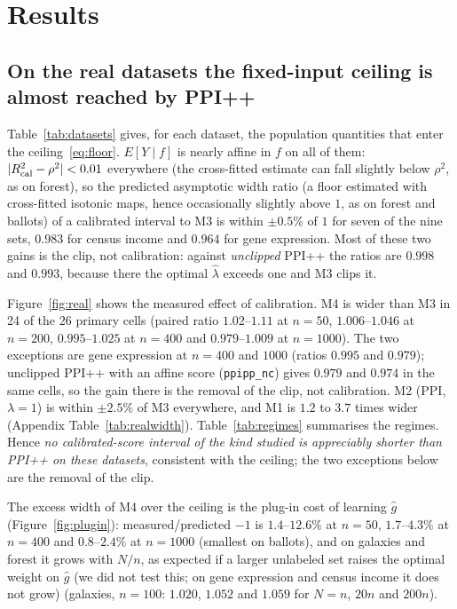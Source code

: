 \begin{table}[t]
\caption{Methods compared. All use only the labeled $(Y,f)$ and the unlabeled $f$.}
\label{tab:methods}
\centering\scriptsize
{}
\end{table}

\section{Results}
\label{sec:results}
\subsection{On the real datasets the fixed-input ceiling is almost reached by PPI++}
\label{sec:real}
Table~\ref{tab:datasets} gives, for each dataset, the population quantities that enter the ceiling~\eqref{eq:floor}. $E[Y\mid f]$ is nearly affine in $f$ on all of them: $|R^2_{\rm cal}-\rho^2|<0.01$ everywhere (the cross-fitted estimate can fall slightly below $\rho^2$, as on forest), so the predicted asymptotic width ratio (a floor estimated with cross-fitted isotonic maps, hence occasionally slightly above $1$, as on forest and ballots) of a calibrated interval to M3 is within $\pm0.5\%$ of $1$ for seven of the nine sets, $0.983$ for census income and $0.964$ for gene expression. Most of these two gains is the clip, not calibration: against \emph{unclipped} PPI++ the ratios are $0.998$ and $0.993$, because there the optimal $\hat\lambda$ exceeds one and M3 clips it.

Figure~\ref{fig:real} shows the measured effect of calibration. M4 is wider than M3 in 24 of the 26 primary cells (paired ratio $1.02$--$1.11$ at $n=50$, $1.006$--$1.046$ at $n=200$, $0.995$--$1.025$ at $n=400$ and $0.979$--$1.009$ at $n=1000$). The two exceptions are gene expression at $n=400$ and $1000$ (ratios $0.995$ and $0.979$); unclipped PPI++ with an affine score (\texttt{ppipp\_nc}) gives $0.979$ and $0.974$ in the same cells, so the gain there is the removal of the clip, not calibration. M2 (PPI, $\lambda=1$) is within $\pm2.5\%$ of M3 everywhere, and M1 is $1.2$ to $3.7$ times wider (Appendix Table~\ref{tab:realwidth}). Table~\ref{tab:regimes} summarises the regimes. Hence \emph{no calibrated-score interval of the kind studied is appreciably shorter than PPI++ on these datasets}, consistent with the ceiling; the two exceptions below are the removal of the clip.

The excess width of M4 over the ceiling is the plug-in cost of learning $\hat g$ (Figure~\ref{fig:plugin}): measured/predicted $-1$ is $1.4$--$12.6\%$ at $n=50$, $1.7$--$4.3\%$ at $n=400$ and $0.8$--$2.4\%$ at $n=1000$ (smallest on ballots), and on galaxies and forest it grows with $N/n$, as expected if a larger unlabeled set raises the optimal weight on $\hat g$ (we did not test this; on gene expression and census income it does not grow) (galaxies, $n=100$: $1.020$, $1.052$ and $1.059$ for $N=n$, $20n$ and $200n$).



